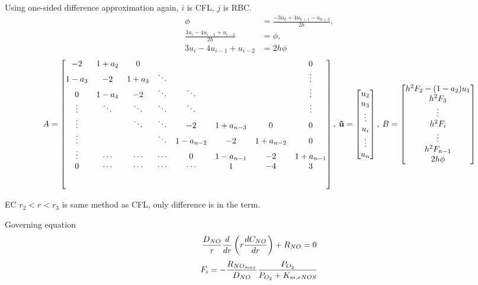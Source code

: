 \documentclass[8pt, a4paper]{article}
\begin{document}
  Using one-sided difference approximation again, $i$ is CFL, $j$ is RBC.
  \begin{align*}
  \phi&=\frac{-3u_k+4u_{k+1}-u_{k+2}}{2h},\\
  \frac{3u_i-4u_{i-1}+u_{i-2}}{2h}&=\phi,\\
  3u_i-4u_{i-1}+u_{i-2}&=2h\phi
  \end{align*}
  \begin{equation}
  A=
  \begin{bmatrix}
  -2 & 1+a_2 & 0 & & & & & 0\\
  1-a_3 & -2 & 1+a_3 & \ddots & & & & \vdots\\
  0 & 1-a_4 & -2 & \ddots & \ddots & &  & \vdots\\
  \vdots & \ddots & \ddots & \ddots & \ddots & & & \vdots\\
  \vdots & & \ddots & \ddots & -2 & 1+a_{n-3} & 0 & 0\\
  \vdots & & & \ddots & 1-a_{n-2} & -2 & 1+a_{n-2} & 0\\
  \vdots & \cdots & \cdots & \cdots & 0 & 1-a_{n-1} & -2 & 1+a_{n-1}\\
  0 & \cdots & \cdots & \cdots & \cdots & 1 & -4 & 3\\[5ex]
  \end{bmatrix},\:
  \mathbf{\vec{u}}=
  \begin{bmatrix}
  u_2\\
  u_3\\
  \vdots\\
  u_i\\
  \vdots\\
  u_n
  \end{bmatrix},\:
  B=
  \begin{bmatrix}
  h^2F_2-(1-a_2)u_1\\
  h^2F_3\\
  \vdots\\
  h^2F_i\\
  \vdots\\
  h^2F_{n-1}\\
  2h\phi
  \end{bmatrix}
  \end{equation}
  
  EC $r_2<r<r_3$ is same method as CFL, only difference is in the \RNO term.
  
  Governing equation
  \begin{equation*}
  \frac{D_{NO}}{r}\frac{d}{dr}\left(r\frac{dC_{NO}}{dr}\right)+R_{NO}=0
  \end{equation*}
  \begin{equation*}
  F_i=-\frac{R_{NO_{max}}}{D_{NO}}\frac{P_{O_2}}{P_{O_2}+K_{m,eNOS}}
  \end{equation*}
  
\end{document}
